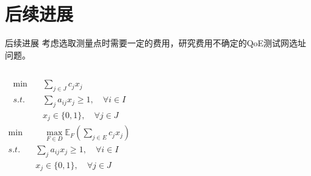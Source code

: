 \documentclass[10pt]{beamer}
\begin{document}
\section{后续进展}
\begin{frame}{后续进展}
考虑选取测量点时需要一定的费用，研究费用不确定的QoE测试网选址问题。
\begin{columns} 
 \begin{align*}
\min \quad& \sum_{j\in J}c_jx_j \\
s.t. \quad& \sum_j a_{ij}x_j\geqslant 1, \quad \forall i\in I\\
& x_j \in \{0,1\},\quad \forall j\in J
\end{align*}
\begin{align*}
\min &\quad \max_{F\in D}\mathbb{E}_{F}(\sum_{j\in E}c_jx_j) \\
s.t. \quad& \sum_j a_{ij}x_j\geqslant 1, \quad \forall i\in I\\
& x_j \in \{0,1\},\quad \forall j\in J
\end{align*}
\end{columns}


\end{frame}
\end{document}
